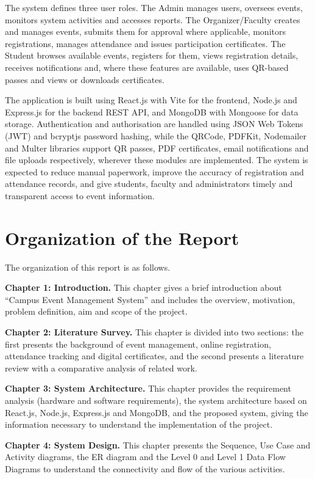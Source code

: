 \documentclass[12pt,a4paper]{report}
\begin{document}
The system defines three user roles. The Admin manages users, oversees events, monitors system activities and accesses reports. The Organizer/Faculty creates and manages events, submits them for approval where applicable, monitors registrations, manages attendance and issues participation certificates. The Student browses available events, registers for them, views registration details, receives notifications and, where these features are available, uses QR-based passes and views or downloads certificates.

The application is built using React.js with Vite for the frontend, Node.js and Express.js for the backend REST API, and MongoDB with Mongoose for data storage. Authentication and authorisation are handled using JSON Web Tokens (JWT) and bcryptjs password hashing, while the QRCode, PDFKit, Nodemailer and Multer libraries support QR passes, PDF certificates, email notifications and file uploads respectively, wherever these modules are implemented. The system is expected to reduce manual paperwork, improve the accuracy of registration and attendance records, and give students, faculty and administrators timely and transparent access to event information.
\newpage

\chapter*{Organization of the Report}
The organization of this report is as follows.

\textbf{Chapter 1: Introduction.} This chapter gives a brief introduction about ``Campus Event Management System'' and includes the overview, motivation, problem definition, aim and scope of the project.

\textbf{Chapter 2: Literature Survey.} This chapter is divided into two sections: the first presents the background of event management, online registration, attendance tracking and digital certificates, and the second presents a literature review with a comparative analysis of related work.

\textbf{Chapter 3: System Architecture.} This chapter provides the requirement analysis (hardware and software requirements), the system architecture based on React.js, Node.js, Express.js and MongoDB, and the proposed system, giving the information necessary to understand the implementation of the project.

\textbf{Chapter 4: System Design.} This chapter presents the Sequence, Use Case and Activity diagrams, the ER diagram and the Level 0 and Level 1 Data Flow Diagrams to understand the connectivity and flow of the various activities.
\end{document}
